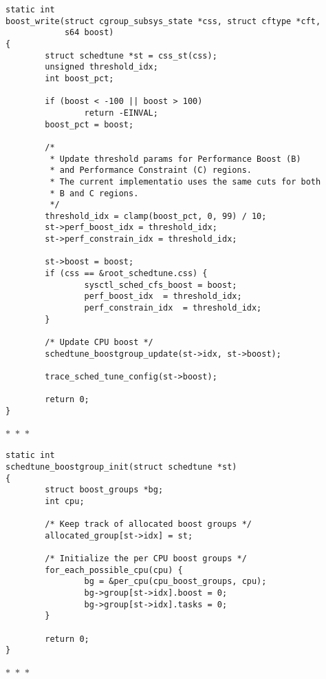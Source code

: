 \documentclass{article}
\newcommand{\divider}{{\begin{center}
  $\ast$~$\ast$~$\ast$
\end{center}}}
\begin{document}
\begin{verbatim}
static int
boost_write(struct cgroup_subsys_state *css, struct cftype *cft,
            s64 boost)
{
        struct schedtune *st = css_st(css);
        unsigned threshold_idx;
        int boost_pct;

        if (boost < -100 || boost > 100)
                return -EINVAL;
        boost_pct = boost;

        /*
         * Update threshold params for Performance Boost (B)
         * and Performance Constraint (C) regions.
         * The current implementatio uses the same cuts for both
         * B and C regions.
         */
        threshold_idx = clamp(boost_pct, 0, 99) / 10;
        st->perf_boost_idx = threshold_idx;
        st->perf_constrain_idx = threshold_idx;

        st->boost = boost;
        if (css == &root_schedtune.css) {
                sysctl_sched_cfs_boost = boost;
                perf_boost_idx  = threshold_idx;
                perf_constrain_idx  = threshold_idx;
        }

        /* Update CPU boost */
        schedtune_boostgroup_update(st->idx, st->boost);

        trace_sched_tune_config(st->boost);

        return 0;
}
\end{verbatim}
\divider
\begin{verbatim}
static int
schedtune_boostgroup_init(struct schedtune *st)
{
        struct boost_groups *bg;
        int cpu;

        /* Keep track of allocated boost groups */
        allocated_group[st->idx] = st;

        /* Initialize the per CPU boost groups */
        for_each_possible_cpu(cpu) {
                bg = &per_cpu(cpu_boost_groups, cpu);
                bg->group[st->idx].boost = 0;
                bg->group[st->idx].tasks = 0;
        }

        return 0;
}
\end{verbatim}
\divider
\end{document}
